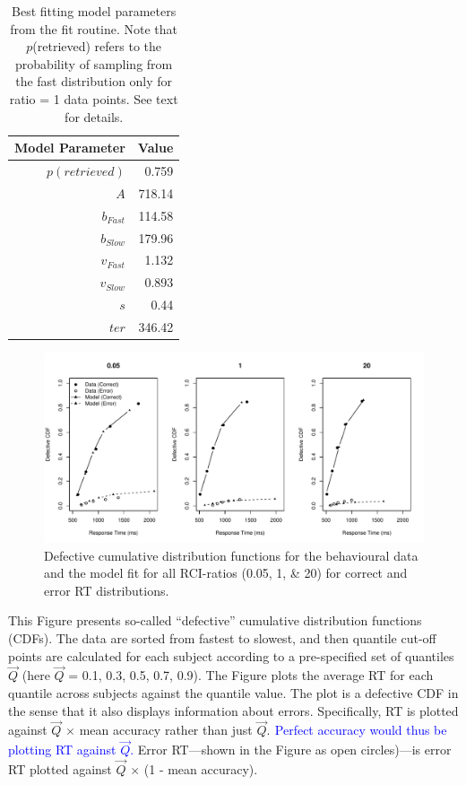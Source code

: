 \documentclass[a4paper, man, natbib]{apa6}
\newcommand{\jg}[1]{\textcolor{blue}{$^{\textrm{}}${#1}}}
\begin{document}
\begin{table}[htbp]
  \centering
  \caption{Best fitting model parameters from the fit routine. Note that $p$(retrieved) refers to the probability of sampling from the fast distribution only for ratio = 1 data points. See text for details.}
    \begin{tabular}{rr}
    \toprule
    Model Parameter & Value \\
    \midrule
    $p(retrieved)$     & 0.759 \\
    $A$     & 718.14 \\
    $b_{Fast}$ & 114.58 \\
    $b_{Slow}$ & 179.96 \\
    $v_{Fast}$ & 1.132 \\
    $v_{Slow}$ & 0.893 \\
    $s$     & 0.44 \\
    $ter$   & 346.42 \\
    \bottomrule
    \end{tabular}
  \label{tab:bestParameters}
\end{table}


\begin{figure}
\begin{center}
\includegraphics[width = \textwidth]{Images/qmp2RCI_drift_+_b.pdf}
\caption{Defective cumulative distribution functions for the behavioural data and the model fit for all RCI-ratios (0.05, 1, \& 20) for correct and error RT distributions.}
\label{fig:modelFit}
\end{center}
\end{figure}

This Figure presents so-called ``defective'' cumulative distribution functions (CDFs). The data are sorted from fastest to slowest, and then quantile cut-off points are calculated for each subject according to a pre-specified set of quantiles $\vec{Q}$ (here $\vec{Q}$ = 0.1, 0.3, 0.5, 0.7, 0.9). The Figure plots the average RT for each quantile across subjects against the quantile value. The plot is a defective CDF in the sense that it also displays information about errors. Specifically, RT is plotted against $\vec{Q}$ $\times$ mean accuracy rather than just $\vec{Q}$. \jg{Perfect accuracy would thus be plotting RT against $\vec{Q}$.} Error RT---shown in the Figure as open circles)---is error RT plotted against $\vec{Q}$ $\times$ (1 - mean accuracy).
\end{document}
